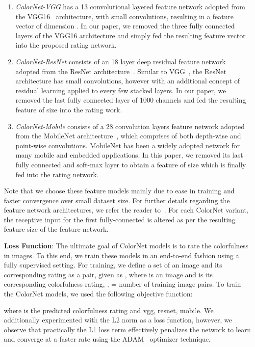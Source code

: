 \documentclass{article}
\begin{document}
\begin{enumerate}
    \item \textit{ColorNet-VGG} has a 13 convolutional layered feature network  adopted from the VGG16~\cite{Simonyan15} architecture, with small  convolutions, resulting in a feature vector of dimension . In our paper, we removed the three fully connected layers of the VGG16 architecture and simply fed the resulting feature vector into the proposed rating network.
    
    \item \textit{ColorNet-ResNet} consists of an 18 layer deep residual feature network  adopted from the ResNet architecture~\cite{He2016DeepRL}. Similar to VGG~\cite{Simonyan15}, the ResNet architecture has small  convolutions, however with an additional concept of residual learning applied to every few stacked layers. In our paper, we removed the last fully connected layer of 1000 channels and fed the resulting feature of size  into the rating work. 
    
    \item \textit{ColorNet-Mobile} consists of a 28 convolution layers feature network  adopted from the MobileNet architecture~\cite{MobileNetsEC}, which comprises of both depth-wise and point-wise convolutions. MobileNet has been a widely adopted network for many mobile and embedded applications. In this paper, we removed its last fully connected and soft-max layer to obtain a feature of size  which is finally fed into the rating network.
\end{enumerate}

Note that we choose these feature models mainly due to ease in training and faster convergence over small dataset size. For further details regarding the feature network architectures, we refer the reader to~\cite{Simonyan15,He2016DeepRL,MobileNetsEC}. For each ColorNet variant, the receptive input for the first fully-connected is altered as per the resulting feature size of the feature network. 

\textbf{Loss Function}: The ultimate goal of ColorNet models is to rate the colorfulness in images. To this end, we train these models in an end-to-end fashion using a fully supervised setting. For training, we define a set of an image and its corresponding rating as a pair, given as , where  is an image and  is its corresponding colorfulness rating, ,  = number of training image pairs. To train the ColorNet models, we used the following objective function:

where  is the predicted colorfulness rating and vgg, resnet, mobile. We additionally experimented with the L2 norm as a loss function, however, we observe that practically the L1 loss term effectively penalizes the network to learn and converge at a faster rate using the ADAM~\cite{KingmaB14adam2} optimizer technique. 
\end{document}
